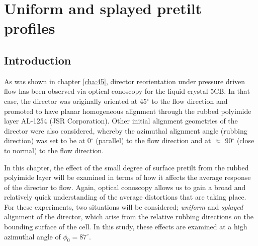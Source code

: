 \section{Uniform and splayed pretilt profiles}
\label{cha:splay_uniform}
\subsection{Introduction}
As was shown in chapter \ref{cha:45}, director reorientation under pressure driven flow has been observed via optical conoscopy for the liquid crystal 5CB. In that case, the director was originally oriented at 45$^{\circ}$ to the flow direction and promoted to have planar homogeneous alignment through the rubbed polyimide layer AL-1254 (JSR Corporation). Other initial alignment geometries of the director were also considered, whereby the azimuthal alignment angle (rubbing direction) was set to be at 0$^{\circ}$ (parallel) to the flow direction and at $\approx$ 90$^{\circ}$ (close to normal) to the flow direction.

In this chapter, the effect of the small degree of surface pretilt from the rubbed polyimide layer will be examined in terms of how it affects the average response of the director to flow. Again, optical conoscopy allows us to gain a broad and relatively quick understanding of the average distortions that are taking place. For these experiments, two situations will be considered; \textit{uniform} and \textit{splayed} alignment of the director, which arise from the relative rubbing directions on the bounding surface of the cell. In this study, these effects are examined at a high azimuthal angle of $\phi_0=87^{\circ}$.

